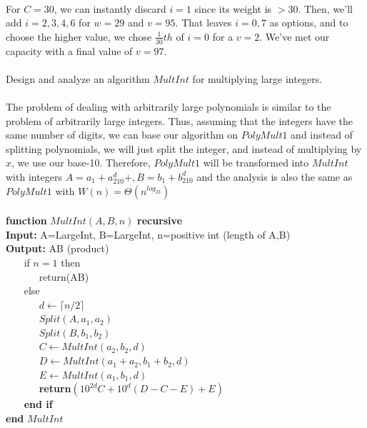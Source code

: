 \documentclass[letterpaper,10pt]{article}
\begin{document}
\begin{flushleft}
~\\


  For $C=30$, we can instantly discard $i=1$ since its weight is $>30$.  Then, we'll add $i=2,3,4,6$ for $w=29$ and $v=95$.  That leaves $i=0,7$ as options, and to choose the higher value, we chose $\frac{1}{30}th$ of $i=0$ for a $v=2$.  We've met our capacity with a final value of $v=97$. \\
~\\

  Design and analyze an algorithm $MultInt$ for multiplying large integers.\\
~\\
The problem of dealing with arbitrarily large polynomials is similar to the problem of arbitrarily large integers.  Thus, assuming that the integers have the same number of digits, we can base our algorithm on $PolyMult1$ and instead of splitting polynomials, we will just split the integer, and instead of multiplying by $x$, we use our base-10.  Therefore, $PolyMult1$ will be transformed into $MultInt$ with integers $A=a_1+a_210^d+,B=b_1+b_210^d$ and the analysis is also the same as $PolyMult1$ with $W(n)=\Theta (n^{log_23})$\\
~\\
\textbf{function} $MultInt(A,B,n)$ \textbf{recursive}\\
\textbf{Input:} A=LargeInt, B=LargeInt, n=positive int (length of A,B)\\
\textbf{Output:} AB (product)\\
~~~ if $n=1$ then\\
~~~~~~ return(AB)\\
~~~ else\\
~~~~~~ $d \leftarrow \lceil n/2 \rceil$\\
~~~~~~ $Split(A,a_1,a_2)$\\
~~~~~~ $Split(B,b_1,b_2)$\\
~~~~~~ $C \leftarrow MultInt(a_2,b_2,d)$\\
~~~~~~ $D \leftarrow MultInt(a_1+a_2,b_1+b_2,d)$\\
~~~~~~ $E \leftarrow MultInt(a_1,b_1,d)$\\
~~~~~~ \textbf{return}$(10^{2d}C+10^d(D-C-E)+E)$\\
~~~ \textbf{end if}\\
\textbf{end} $MultInt$\\
~\\
~\\


\end{flushleft}
\end{document}
